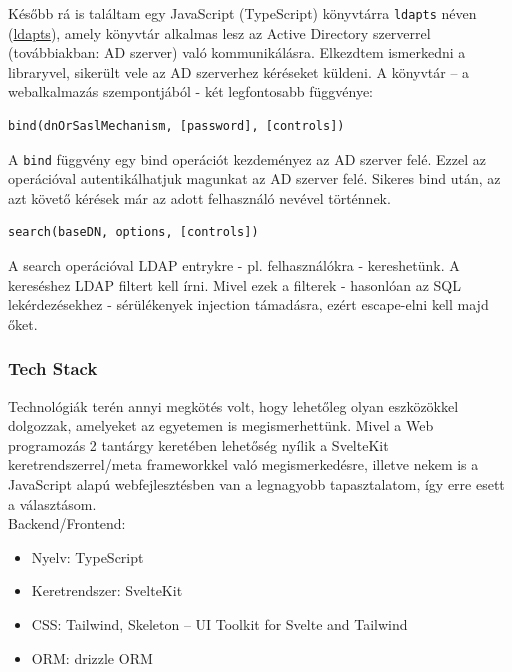 \documentclass[a4paper]{article}
\newcommand{\inlts}[1]{\texttt{#1}}
\begin{document}
Később rá is találtam egy JavaScript (TypeScript) könyvtárra \inlts{ldapts} néven
(\href{https://github.com/ldapts/ldapts}{ldapts}), amely könyvtár alkalmas lesz az Active Directory szerverrel
(továbbiakban: AD szerver) való kommunikálásra. Elkezdtem ismerkedni a libraryvel, sikerült vele az
AD szerverhez kéréseket küldeni. A könyvtár – a webalkalmazás szempontjából - két legfontosabb
függvénye:

\FloatBarrier
\begin{verbatim}
bind(dnOrSaslMechanism, [password], [controls])
\end{verbatim}

A \inlts{bind} függvény egy bind operációt kezdeményez az AD szerver felé. Ezzel az operációval
autentikálhatjuk magunkat az AD szerver felé. Sikeres bind után, az azt követő kérések már az adott
felhasználó nevével történnek.

\FloatBarrier
\begin{verbatim}
search(baseDN, options, [controls])
\end{verbatim}

A search operációval LDAP entrykre - pl. felhasználókra - kereshetünk. A kereséshez LDAP filtert kell
írni. Mivel ezek a filterek - hasonlóan az SQL lekérdezésekhez - sérülékenyek injection támadásra, ezért
escape-elni kell majd őket.

\subsubsection*{Tech Stack}
Technológiák terén annyi megkötés volt, hogy lehetőleg olyan eszközökkel dolgozzak, amelyeket az
egyetemen is megismerhettünk. Mivel a Web programozás 2 tantárgy keretében lehetőség nyílik a
SvelteKit keretrendszerrel/meta frameworkkel való megismerkedésre, illetve nekem is a JavaScript
alapú webfejlesztésben van a legnagyobb tapasztalatom, így erre esett a választásom.\\

Backend/Frontend:
\begin{itemize}
  \item Nyelv: TypeScript
  \item Keretrendszer: SvelteKit
  \item CSS: Tailwind, Skeleton – UI Toolkit for Svelte and Tailwind
  \item ORM: drizzle ORM
\end{itemize}
\end{document}
